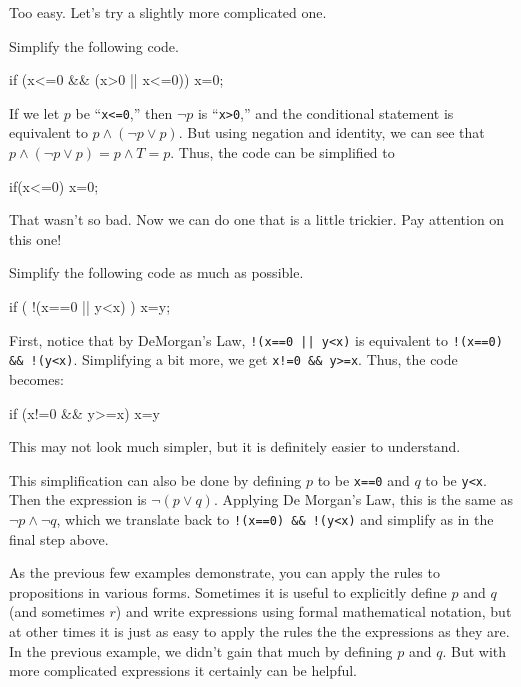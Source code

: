 Too easy. Let's try a slightly more complicated one.

\begin{exa}
Simplify the following code.
\begin{code}
    if (x<=0 && (x>0 || x<=0)) {
       x=0;
    }
\end{code}
\begin{sol}
If we let $p$ be ``\verb+x<=0+,'' then $\neg p$ is ``\verb+x>0+,''
and the conditional statement is equivalent to  $p \wedge(\neg p\vee p)$.
But using negation and identity, we can see that
$p \wedge(\neg p\vee p)=p\wedge T=p$.
Thus, the code can be simplified to 
\begin{code}
    if(x<=0) { 
        x=0; 
    }
\end{code}
\end{sol}
\end{exa}

That wasn't so bad. Now we can do one that is a little trickier.
Pay attention on this one!
\begin{exa}
Simplify the following code as much as possible. 
\begin{code} 
    if ( !(x==0 || y<x) ) {
        x=y;
    }
\end{code}
\begin{sol}
First, notice that by DeMorgan's Law,  \verb+!(x==0 || y<x)+ is equivalent to
\verb+!(x==0) && !(y<x)+.  Simplifying a bit more, we get 
\verb+x!=0 && y>=x+.  Thus, the code becomes:
\begin{code}
    if (x!=0 && y>=x) {
        x=y
    }
\end{code}
This may not look much simpler, but it is definitely easier to understand.

This simplification can also be done by defining $p$ to be \verb+x==0+ and $q$ to be \verb+y<x+.
Then the expression is $\neg(p\vee q)$.  Applying De Morgan's Law, this is the same as $\neg p\wedge \neg q$,
which we translate back to \verb+!(x==0) && !(y<x)+ and simplify as in the final step above.
\end{sol}

\end{exa}
As the previous few examples demonstrate, you can apply the rules to propositions in various forms.
Sometimes it is useful to explicitly define $p$ and $q$ (and sometimes $r$) and write expressions using
formal mathematical notation, but at other times it is just as easy to apply the rules the the expressions
as they are.  In the previous example, we didn't gain that much by defining $p$ and $q$.  
But with more complicated expressions it certainly can be helpful.

